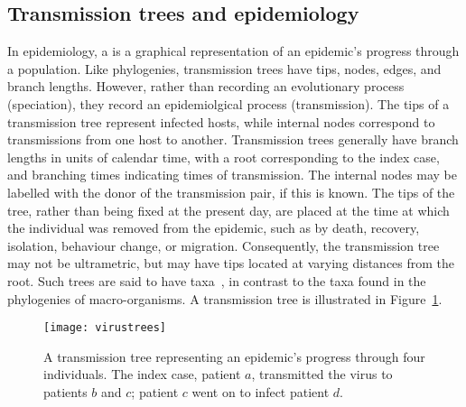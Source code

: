 \subsection{Transmission trees and epidemiology}

In epidemiology, a  is a graphical representation of an
epidemic's progress through a population. Like phylogenies, transmission trees
have tips, nodes, edges, and branch lengths. However, rather than recording an
evolutionary process (speciation), they record an epidemiolgical process
(transmission). The tips of a transmission tree represent infected hosts, while
internal nodes correspond to transmissions from one host to another.
Transmission trees generally have branch lengths in units of calendar time,
with a root corresponding to the index case, and branching times indicating
times of transmission. The internal nodes may be labelled with
the donor of the transmission pair, if this is known. The tips of the tree,
rather than being fixed at the present day, are placed at the time at which the
individual was removed from the epidemic, such as by death, recovery,
isolation, behaviour change, or migration. Consequently, the transmission tree
may not be ultrametric, but may have tips located at varying distances from the
root. Such trees are said to have 
taxa~\autocite{drummond2003measurably}, in contrast to the
 taxa found in the phylogenies of macro-organisms.  A
transmission tree is illustrated in Figure~\ref{fig:virustrees}.

\begin{figure}
    \centering
    \texttt{[image: virustrees]}
    \label{fig:virustrees}
    \caption[Illustration of a transmission tree]{
        A transmission tree representing an epidemic's progress through
        four individuals. The index case, patient $a$, transmitted the
        virus to patients $b$ and $c$; patient $c$ went on to infect
        patient $d$. 
    }
\end{figure}

